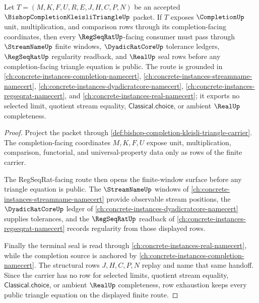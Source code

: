 \begin{theorem}
\label{thm:bishop-completion-kleisli-triangle-regseqrat-handoff}
Let $T=(M,K,F,U,R,E,J,H,C,P,N)$ be an accepted $\BishopCompletionKleisliTriangleUp$ packet. If $T$ exposes $\CompletionUp$ unit, multiplication, and comparison rows through its completion-facing coordinates, then every $\RegSeqRatUp$-facing consumer must pass through $\StreamNameUp$ finite windows, $\DyadicRatCoreUp$ tolerance ledgers, $\RegSeqRatUp$ regularity readback, and $\RealUp$ seal rows before any completion-facing triangle equation is public. The route is grounded in \autoref{ch:concrete-instances-completion-namecert}, \autoref{ch:concrete-instances-streamname-namecert}, \autoref{ch:concrete-instances-dyadicratcore-namecert}, \autoref{ch:concrete-instances-regseqrat-namecert}, and \autoref{ch:concrete-instances-real-namecert}; it exports no selected limit, quotient stream equality, $\mathsf{Classical.choice}$, or ambient $\RealUp$ completeness.
\end{theorem}
\begin{proof}
Project the packet through \autoref{def:bishop-completion-kleisli-triangle-carrier}. The completion-facing coordinates $M,K,F,U$ expose unit, multiplication, comparison, functorial, and universal-property data only as rows of the finite carrier.

The RegSeqRat-facing route then opens the finite-window surface before any triangle equation is public. The $\StreamNameUp$ windows of \autoref{ch:concrete-instances-streamname-namecert} provide observable stream positions, the $\DyadicRatCoreUp$ ledger of \autoref{ch:concrete-instances-dyadicratcore-namecert} supplies tolerances, and the $\RegSeqRatUp$ readback of \autoref{ch:concrete-instances-regseqrat-namecert} records regularity from those displayed rows.

Finally the terminal seal is read through \autoref{ch:concrete-instances-real-namecert}, while the completion source is anchored by \autoref{ch:concrete-instances-completion-namecert}. The structural rows $J,H,C,P,N$ replay and name that same handoff. Since the carrier has no row for selected limits, quotient stream equality, $\mathsf{Classical.choice}$, or ambient $\RealUp$ completeness, row exhaustion keeps every public triangle equation on the displayed finite route.
\end{proof}
